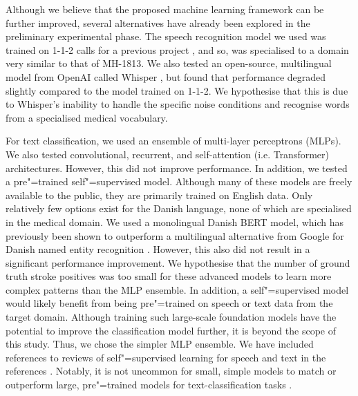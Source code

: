{Although we believe that the proposed machine learning framework can be further improved, several alternatives have already been explored in the preliminary experimental phase. The speech recognition model we used was trained on 1-1-2 calls for a previous project \parencite{cite14}, and so, was specialised to a domain very similar to that of MH-1813. We also tested an open-source, multilingual model from OpenAI called Whisper \parencite{radford_robust_2023}, but found that performance degraded slightly compared to the model trained on 1-1-2. We hypothesise that this is due to Whisper's inability to handle the specific noise conditions and recognise words from a specialised medical vocabulary.

For text classification, we used an ensemble of multi-layer perceptrons (MLPs). We also tested convolutional, recurrent, and self-attention (i.e. Transformer) architectures. However, this did not improve performance. In addition, we tested a pre"=trained self"=supervised model. Although many of these models are freely available to the public, they are primarily trained on English data. Only relatively few options exist for the Danish language, none of which are specialised in the medical domain. We used a monolingual Danish BERT model, which has previously been shown to outperform a multilingual alternative from Google for Danish named entity recognition \parencite{hvingelby_dane_2020}. However, this also did not result in a significant performance improvement. We hypothesise that the number of ground truth stroke positives was too small for these advanced models to learn more complex patterns than the MLP ensemble. In addition, a self"=supervised model would likely benefit from being pre"=trained on speech or text data from the target domain. Although training such large-scale foundation models have the potential to improve the classification model further, it is beyond the scope of this study. Thus, we chose the simpler MLP ensemble. We have included references to reviews of self"=supervised learning for speech and text in the references \parencite{gururangan_don_2020,mohamed_selfsupervised_2022}. Notably, it is not uncommon for small, simple models to match or outperform large, pre"=trained models for text-classification tasks \parencite{galke_bagofwords_2022}.

}
